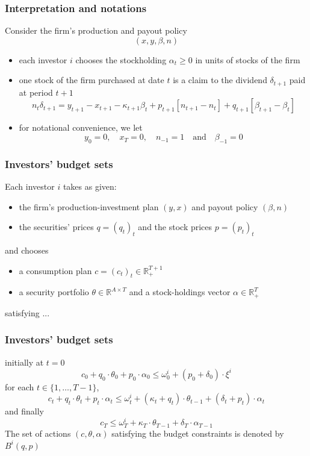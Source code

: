 \documentclass[blue]{beamer}
\def\R{\mathbb{R}}
\def\leq{\leqslant}
\def\geq{\geqslant}
\def\et{\quad \textrm{and} \quad}
\theoremstyle{definition}
\theoremstyle{example}
\begin{document}

\begin{frame}\frametitle{Interpretation and notations}

Consider the firm's production and payout policy
\[
(x,y,\beta,n)
\]
\begin{itemize}
\item each investor $i$ chooses the stockholding $\alpha_t \geq 0$ \alert{in units of stocks} of the firm
\item one stock of the firm purchased at date $t$ is a claim to the dividend $\delta_{t+1}$ paid at period $t+1$
\[
n_t \delta_{t+1}=y_{t+1}- x_{t+1} - \kappa_{t+1}\beta_t  + p_{t+1} [n_{t+1} - n_{t}] + q_{t+1} [\beta_{t+1} - \beta_t]
\]
\item for notational convenience, we let
\[
y_0 =0, \quad x_T=0, \quad n_{-1}=1 \et \beta_{-1}=0
\]
\end{itemize}
\end{frame}


\begin{frame}\frametitle{Investors' budget sets}

Each investor $i$ takes as given:
    \begin{itemize}
    \item the firm's production-investment plan $(y,x)$ and payout policy $(\beta,n)$
    \item the securities' prices $q=(q_t)_t$ and the stock prices $p=(p_t)_t$
    \end{itemize}
and chooses
    \begin{itemize}
    \item a consumption plan $c=(c_t)_t \in \R^{T+1}_+$
    \item a security portfolio $\theta\in \R^{A\times T}$ and a stock-holdings vector $\alpha \in \R^{T}_+$
    \end{itemize}
satisfying ...

\end{frame}


\begin{frame}\frametitle{Investors' budget sets}
initially at $t=0$
\begin{equation}\label{eq:budget-0-ter}
c_0 + q_0\cdot \theta_0 + p_0 \cdot \alpha_0 \leq \omega^i_0 + (p_0 + \delta_0) \cdot \xi^i
\end{equation}
for each $t\in \{1,\ldots,T-1\}$,
\begin{equation}\label{eq:budget-t-ter}
c_t + q_t\cdot \theta_t + p_t \cdot \alpha_t \leq \omega^i_t + (\kappa_t + q_t) \cdot \theta_{t-1} + (\delta_t + p_t) \cdot \alpha_t
\end{equation}
and finally
\[
c_T \leq \omega^i_T + \kappa_T \cdot \theta_{T-1} + \delta_T \cdot \alpha_{T-1}
\]
The set of actions $(c,\theta,\alpha)$ satisfying the budget constraints is denoted by $B^i(q,p)$
\end{frame}
\end{document}
